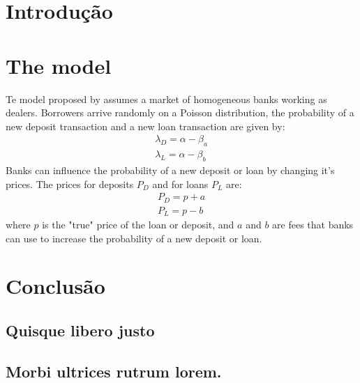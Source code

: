 \chapter{Introdução}


\chapter{The model}\label{cap_trabalho_academico}

Te model proposed by  assumes a market of homogeneous banks working as dealers. Borrowers arrive randomly on a Poisson distribution, the probability of a new deposit transaction and a new loan transaction are given by: 
\begin{align}
  \lambda_D = \alpha - \beta_a \\
  \lambda_L = \alpha - \beta_b
\end{align} 
Banks can influence the probability of a new deposit or loan by changing it's prices. The prices for deposits $P_D$ and for loans $P_L$ are:
\begin{align}
  P_D = p+a \\
  P_L = p-b 
\end{align}
where $p$ is the "true" price of the loan or deposit, and $a$ and $b$ are fees that banks can use to increase the probability of a new deposit or loan.

\chapter{Conclusão}






\begin{apendicesenv}

\partapendices

\chapter{Quisque libero justo}

\lipsum[50]



\end{apendicesenv}


\begin{anexosenv}

\partanexos

\chapter{Morbi ultrices rutrum lorem.}
\lipsum[30]

\end{anexosenv}

\printindex



